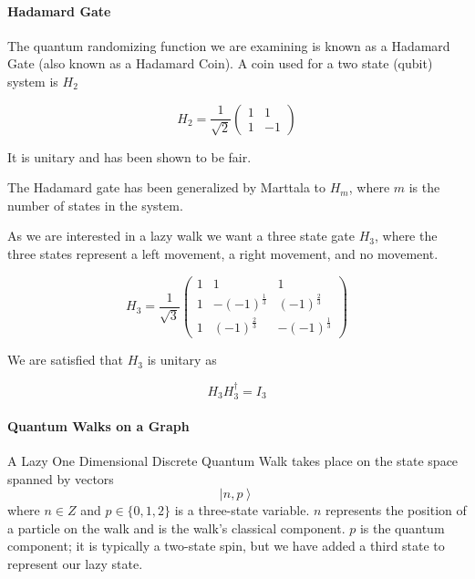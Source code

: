 \documentclass[a0,portrait]{a0poster}
\newcommand{\ket}[1]{\left| #1\right\rangle}
\begin{document}
\begin{center}
{\paragraph{Hadamard Gate}

The quantum randomizing function we are examining is known as a Hadamard Gate (also known as a Hadamard Coin). A coin used for a two state (qubit) system is $H_2$ 

\begin{equation}
H_2 = \dfrac{1}{\sqrt{2}} \begin{pmatrix}
  1 & 1 \\
  1 & -1 
\end{pmatrix}
\label{eq:1}
\end{equation}

It is unitary and has been shown\cite{Ke:2003} to be fair. 

The Hadamard gate has been generalized by Marttala\cite{Ma:2007} to $H_m$, where $m$ is the number of states in the system. 

As we are interested in a lazy walk we want a three state gate $H_3$, where the three states represent a left movement, a right movement, and no movement.

\begin{equation}
H_3 = \dfrac{1}{\sqrt{3}} \begin{pmatrix}
  1 & 1 & 1 \\
  1 & -(-1)^{\frac{1}{3}} & (-1)^{\frac{2}{3}} \\
  1 & (-1)^{\frac{2}{3}} & -(-1)^{\frac{1}{3}}
\end{pmatrix}
\label{eq:5}
\end{equation}

We are satisfied that $H_3$ is unitary as 

\begin{equation}
H_{3}H_{3}^{\dagger} = I_3
\label{eq:6}
\end{equation}

\paragraph{Quantum Walks on a Graph}

A Lazy One Dimensional Discrete Quantum Walk takes place on the state space spanned by vectors
\begin{equation}
\ket{n,p}
\label{eq:7}
\end{equation}
where $n\in Z$
and $p\in \{0,1,2\}$ is a three-state variable. $n$ represents the position of a particle on the walk and is the walk's classical component. $p$ is the quantum component; it is typically a two-state spin, but we have added a third state to represent our lazy state. 

}
\end{center}
\end{document}
